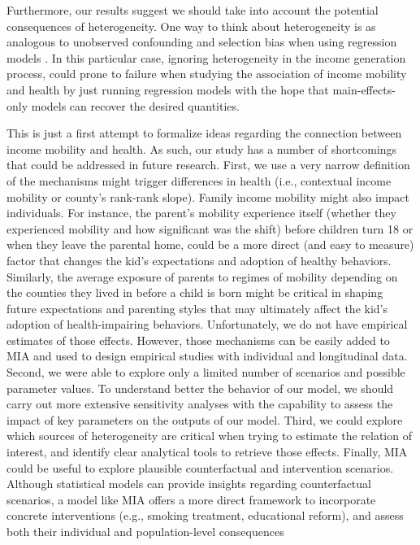 \documentclass[class=article, crop=false, 12pt]{standalone}
\begin{document}
Furthermore, our results suggest we should take into account the potential consequences of heterogeneity. One way to think about heterogeneity is as analogous to unobserved confounding and selection bias when using regression models \citep{elwert2010}. In this particular case, ignoring heterogeneity in the income generation process, could prone to failure when studying the association of income mobility and health by just running regression models with the hope that main-effects-only models can recover the desired quantities.

This is just a first attempt to formalize ideas regarding the connection between income mobility and health. As such, our study has a number of shortcomings that could be addressed in future research. First, we use a very narrow definition of the mechanisms might trigger differences in health (i.e., contextual income mobility or county's rank-rank slope). Family income mobility might also impact individuals. For instance, the parent's mobility experience itself (whether they experienced mobility and how significant was the shift) before children turn 18 or when they leave the parental home, could be a more direct (and easy to measure) factor that changes the kid's expectations and adoption of healthy behaviors. Similarly, the average exposure of parents to regimes of mobility depending on the counties they lived in before a child is born might be critical in shaping future expectations and parenting styles that may ultimately affect the kid's adoption of health-impairing behaviors. Unfortunately, we do not have empirical estimates of those effects. However, those mechanisms can be easily added to MIA and used to design empirical studies with individual and longitudinal data. Second, we were able to explore only a limited number of scenarios and possible parameter values. To understand better the behavior of our model, we should carry out more extensive sensitivity analyses with the capability to assess the impact of key parameters on the outputs of our model. Third, we could explore which sources of heterogeneity are critical when trying to estimate the relation of interest, and identify clear analytical tools to retrieve those effects. Finally, MIA could be useful to explore plausible counterfactual and intervention scenarios. Although statistical models can provide insights regarding counterfactual scenarios, a model like MIA offers a more direct framework to incorporate concrete interventions (e.g., smoking treatment, educational reform), and assess both their individual and population-level consequences 
\end{document}
